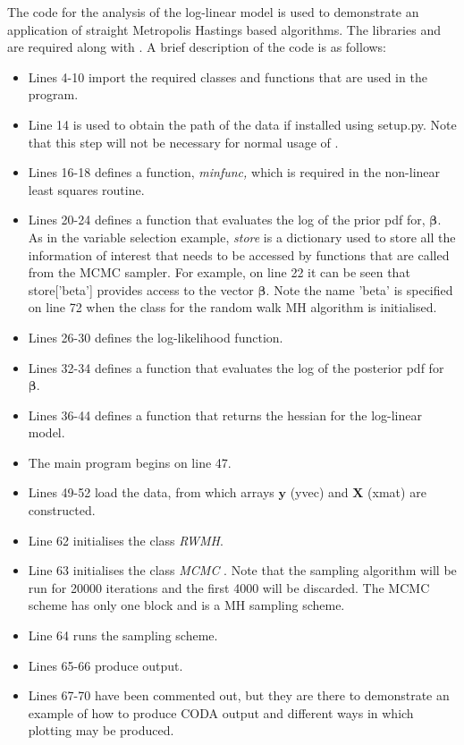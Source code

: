 \documentclass[article]{jss}
\begin{document}
The code for the analysis of the log-linear model is used to
demonstrate an application of straight Metropolis Hastings based
algorithms. The  libraries  and
 are required along with . A brief description
of the code is as follows:
\begin{itemize}
\item Lines 4-10 import the required classes and functions that are
  used in the program.
\item Line 14 is used to obtain the path of the data if installed
  using setup.py. Note that this step will not be necessary for normal
  usage of .
\item Lines 16-18 defines a function, \emph{minfunc,} which is
  required in the non-linear least squares routine.
\item Lines 20-24 defines a function that evaluates the log of the
  prior pdf for, $\bm{\beta}.$ As in the variable selection example,
  \emph{store} is a  dictionary used to store all the
  information of interest that needs to be accessed by functions that
  are called from the MCMC sampler. For example, on line 22 it can be
  seen that store{[}'beta'{]} provides access to the vector
  $\bm{\beta}.$ Note the name 'beta' is specified on line 72 when the
  class for the random walk MH algorithm is initialised.
\item Lines 26-30 defines the log-likelihood function.
\item Lines 32-34 defines a function that evaluates the log of the
  posterior pdf for $\bm{\beta}.$
\item Lines 36-44 defines a function that returns the hessian for the log-linear
model.
\item The main program begins on line 47.
\item Lines 49-52 load the data, from which arrays $\bm{y}$ (yvec) and
  $\bm{X}$ (xmat) are constructed.
\item Line 62 initialises the class \emph{RWMH}. 
\item Line 63 initialises the class \emph{MCMC} . Note that the
  sampling algorithm will be run for 20000 iterations and the first
  4000 will be discarded. The MCMC scheme has only one block and is a
  MH sampling scheme.
\item Line 64 runs the sampling scheme.
\item Lines 65-66 produce output.
\item Lines 67-70 have been commented out, but they are there to
  demonstrate an example of how to produce CODA output and different
  ways in which plotting may be produced.
\end{itemize}
\end{document}
